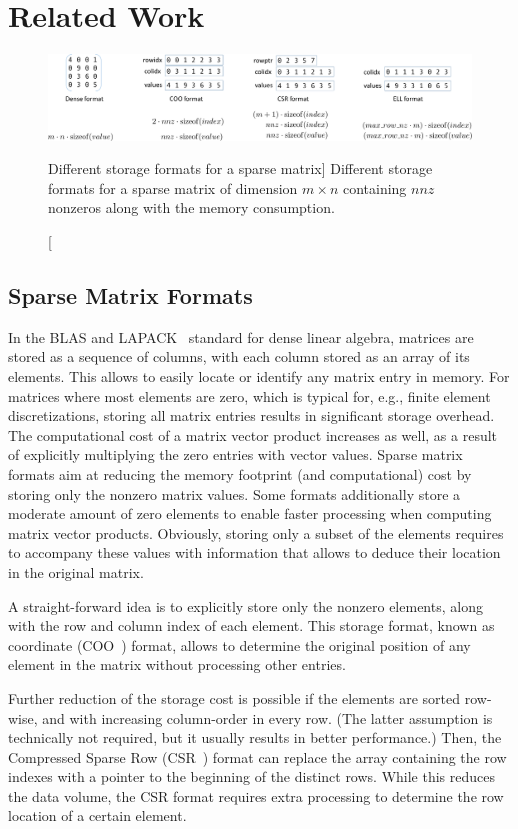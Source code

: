 \section{Related Work}
\label{2017-coo-spmv:s2-related}

\begin{figure}[t]
\centering
\includegraphics[width=\textwidth]{plots/formats}
\caption
[Different storage formats for a sparse matrix]
{Different storage formats for a sparse matrix of dimension $m\times n$
containing $nnz$ nonzeros along with the memory consumption.}
\label{2017-coo-spmv:fig:formatoverview}
\end{figure}

\subsection{Sparse Matrix Formats}
In the BLAS and LAPACK~\cite{lapack} standard for dense linear algebra, 
matrices are stored as a sequence of columns, with each column stored as an
array of its elements.
This allows to easily locate or identify any matrix entry in memory.
For matrices where most elements are zero, which is typical for, e.g., finite
element discretizations,
storing all matrix entries results in significant storage overhead.
The computational cost of a matrix vector product increases as well, as a result
of explicitly multiplying the zero entries with vector values.
Sparse matrix formats aim at reducing the memory footprint (and computational) 
cost by storing only the nonzero matrix values. Some formats additionally store
a moderate amount of zero elements to enable faster processing when computing
matrix vector products. Obviously, storing only a subset of the elements
requires to accompany these values with information that allows to deduce their
location in the original matrix.

A straight-forward idea is to explicitly store only the nonzero elements,
along with the row and column index of each element.
This storage format, known as coordinate (COO~\cite{barrettemplates}) format,
allows to determine the original position of any element
in the matrix without processing other entries.

Further reduction of the storage cost is possible if the elements are
sorted row-wise, and with increasing column-order in every row.
(The latter assumption is technically not required,
but it usually results in better performance.)
Then, the Compressed Sparse Row (CSR~\cite{barrettemplates}) format
can replace the array containing the row indexes with a pointer to the
beginning
of the distinct rows. While this reduces the data volume,
the CSR format requires extra processing to determine the row location of
a certain element.

